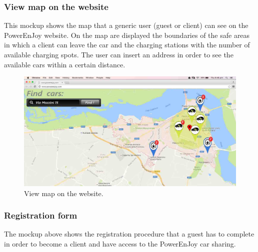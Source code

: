 \subsubsection*{View map on the website} This mockup shows the map that a generic user (guest or client) can see on the PowerEnJoy website. On the map are displayed the boundaries of the safe areas in which a client can leave the car and the charging stations with the number of available charging spots. The user can insert an address in order to see the available cars within a certain distance.
\begin{figure}[hp]
\centering
\includegraphics[width=450 pt]{resources/mappa.jpg}
\caption{\label{fig:mappa}View map on the website.}
\end{figure}

\newpage

\subsubsection*{Registration form} The mockup above shows the registration procedure that a guest has to complete in order to become a client and have access to the PowerEnJoy car sharing.

